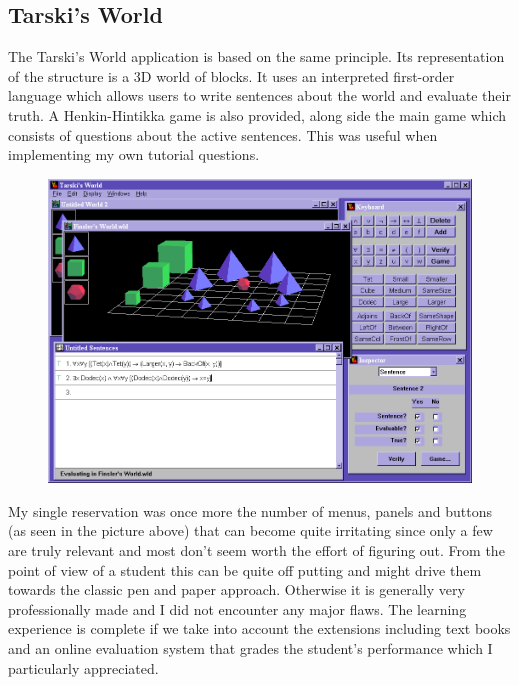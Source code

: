 \documentclass{report}
\begin{document}
\subsection{Tarski's World}
The Tarski's World\cite{tarski} application is based on the same principle. Its 
representation of the structure is a 3D world of blocks. It uses an interpreted 
first-order language which allows users to write sentences about the world and 
evaluate their truth. A Henkin-Hintikka game is also provided, along side the 
main game which consists of questions about the active sentences. This was 
useful when implementing my own tutorial questions. 

\begin{figure}[h!]
\centering \includegraphics[scale=0.3]{tarski.png}
\end{figure}

\noindent My single reservation was once more the number of menus, panels and 
buttons (as seen in the picture above) that can become quite irritating since 
only a few are truly relevant and most don't seem worth the effort of figuring 
out. From the point of view of a student this can be quite off putting and might 
drive them towards the classic pen and paper approach. Otherwise it is generally 
very professionally made and I did not encounter any major flaws. The learning 
experience is complete if we take into account the extensions including text 
books and an online evaluation system that grades the student's performance 
which I particularly appreciated.
\end{document}
